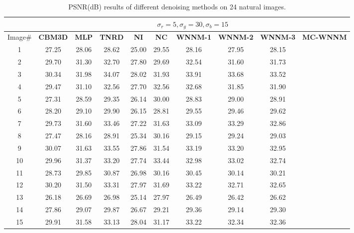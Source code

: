 \documentclass[10pt,onecolumn,letterpaper]{article}
\begin{document}
\begin{table}
\vspace{-1mm}
\caption{PSNR(dB) results of different denoising methods on 24 natural images.}
\label{t1}
\label{taba}
\begin{center}
\renewcommand\arraystretch{1.0}
\footnotesize
\begin{tabular}{|c||c|c|c|c|c|c|c|c|c|}
\hline
&\multicolumn{9}{c|}{ $\sigma_{r} = 5, \sigma_{g} = 30, \sigma_{b} = 15$}
\\
\hline
\hline
Image\#
&
\textbf{CBM3D}
&
\textbf{MLP}
&
\textbf{TNRD}
&
\textbf{NI}
&
\textbf{NC}
&
\textbf{WNNM-1}
&
\textbf{WNNM-2}
&
\textbf{WNNM-3}
&
\textbf{MC-WNNM}
\\
\hline
1 & 27.25 & 28.06 & 28.62 & 25.00 & 29.55 & 28.16 & 27.95 & 28.15 & \textbf{}
\\
\hline
2 & 29.70 & 31.30 & 32.70 & 27.80 & 29.69 & 32.54 & 31.60 & 31.73 & \textbf{}
\\
\hline
3 & 30.34 & 31.98 & 34.07 & 28.02 & 31.93 & 33.91 & 33.68 & 33.52 & \textbf{}
\\
\hline 
4 & 29.47 & 31.10 & 32.56 & 27.70 & 32.56 & 32.68 & 31.85 & 31.90 & \textbf{} 
\\
\hline
5 & 27.31 & 28.59 & 29.35 & 26.14 & 30.00 & 28.83 & 29.00 & 28.91 & \textbf{}
\\
\hline
6 & 28.20 & 29.10 & 29.90 & 26.15 & 28.81 & 29.55 & 29.46 & 29.62 & \textbf{}
\\
\hline
7 & 29.73 & 31.60 & 33.46 & 27.22 & 31.63 & 33.09 & 33.29 & 32.86 & \textbf{} 
\\
\hline
8 & 27.47 & 28.16 & 28.91 & 25.34 & 30.16 & 29.15 & 29.24 & 29.03 & \textbf{}
\\
\hline
9 & 30.07 & 31.63 & 33.55 & 27.86 & 31.54 & 33.19 & 33.20 & 32.95 & \textbf{}
\\
\hline
10 & 29.96 & 31.37 & 33.20 & 27.74 & 33.44 & 32.98 & 33.02 & 32.74 & \textbf{}
\\
\hline
11 & 28.73 & 29.85 & 30.87 & 26.98 & 30.16 & 30.45 & 30.14 & 30.21 & \textbf{}
\\
\hline
12 & 30.20 & 31.50 & 33.31 & 27.97 & 31.69 & 33.22 & 32.71 & 32.65 & \textbf{}
\\
\hline
13 & 26.18 & 26.69 & 26.98 & 25.14 & 27.97 & 26.49 & 26.42 & 26.62 & \textbf{}
\\
\hline
14 & 27.86 & 29.07 & 29.87 & 26.67 & 29.21 & 29.36 & 29.14 & 29.30 & \textbf{}
\\
\hline
15 & 29.91 & 31.58 & 33.13 & 28.04 & 31.17 & 33.22 & 32.34 & 32.36 & \textbf{}

\end{tabular}
\end{center}
\end{table}
\end{document}
